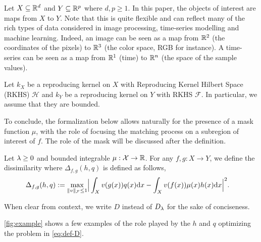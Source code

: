 Let $X \subseteq \mathbb R^d$ and $Y \subseteq \mathbb R^p$ where $d, p \geq 1$. In this paper, the objects of interest are maps from $X$ to $Y$. Note that this is quite flexible and can reflect many of the rich types of data considered in image processing, time-series modelling and machine learning. Indeed, an image can be seen as a map from $\mathbb R^2$ (the coordinates of the pixels) to $\mathbb R^3$ (the color space, RGB for instance). A time-series can be seen as a map from $\mathbb R^1$ (time) to $\mathbb R^n$ (the space of the sample values).

Let $k_X$ be a reproducing kernel on $X$ with Reproducing Kernel Hilbert Space (RKHS) $\mathcal H$  \cite{aronszajn1950theory} and $k_Y$ be a reproducing kernel on $Y$ with RKHS $\mathcal F$. In particular, we assume that they are bounded.


To conclude, the formalization below allows naturally for the presence of a mask function $\mu$, with the role of focusing the matching process on a subregion of interest of $f$. The role of the mask will be discussed after the definition.


\begin{definition}\label{def:D}
    Let $\lambda \geq 0$ and bounded integrable $\mu:{\cal X} \to \mathbb R$.  For any $f,g:X\to Y$, we define the dissimilarity
where $\Delta_{f, g}(h, q)$ is defined as follows,
\begin{align*}
\Delta_{f, g}(h, q) := \max_{\|v\|_{{\cal F}} \leq 1} &\Big|  \int_X v(g(x))q(x)\mathrm{d} x-  \int_X v(f(x))\mu(x)h(x)\mathrm{d} x\Big|^2.
\end{align*}
\end{definition}

When clear from context, we write $D$ instead of $D_\lambda$ for the sake of conciseness.

\cref{fig:example} shows a few examples of the role played by the $h$ and $q$ optimizing the problem in \cref{eq:def-D}.


